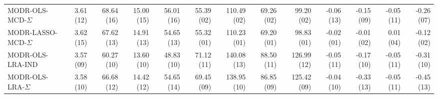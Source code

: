 \begin{tabular}{lrrrrrrrrrrrr}
MODR-OLS-MCD-$\Sigma$ & {\cellcolor[HTML]{D38E8E}} \color[HTML]{F1F1F1} 3.61 (12) & {\cellcolor[HTML]{CD5C5C}} \color[HTML]{F1F1F1} 68.64 (16) & {\cellcolor[HTML]{CD6060}} \color[HTML]{F1F1F1} 15.00 (15) & {\cellcolor[HTML]{CD5C5C}} \color[HTML]{F1F1F1} 56.01 (16) & {\cellcolor[HTML]{008080}} \color[HTML]{F1F1F1} 55.39 (02) & {\cellcolor[HTML]{028181}} \color[HTML]{F1F1F1} 110.49 (02) & {\cellcolor[HTML]{008080}} \color[HTML]{F1F1F1} 69.26 (02) & {\cellcolor[HTML]{038181}} \color[HTML]{F1F1F1} 99.20 (02) & {\cellcolor[HTML]{8ABABA}} \color[HTML]{000000} -0.06 (13) & {\cellcolor[HTML]{D7ADAD}} \color[HTML]{000000} -0.15 (09) & {\cellcolor[HTML]{D8BCBC}} \color[HTML]{000000} -0.05 (11) & {\cellcolor[HTML]{C0D0D0}} \color[HTML]{000000} -0.26 (07) \\
MODR-LASSO-MCD-$\Sigma$ & {\cellcolor[HTML]{D28888}} \color[HTML]{F1F1F1} 3.62 (15) & {\cellcolor[HTML]{CE6161}} \color[HTML]{F1F1F1} 67.62 (13) & {\cellcolor[HTML]{CE6464}} \color[HTML]{F1F1F1} 14.91 (13) & {\cellcolor[HTML]{CE6464}} \color[HTML]{F1F1F1} 54.65 (13) & {\cellcolor[HTML]{008080}} \color[HTML]{F1F1F1} 55.32 (01) & {\cellcolor[HTML]{008080}} \color[HTML]{F1F1F1} 110.23 (01) & {\cellcolor[HTML]{008080}} \color[HTML]{F1F1F1} 69.20 (01) & {\cellcolor[HTML]{008080}} \color[HTML]{F1F1F1} 98.83 (01) & {\cellcolor[HTML]{008080}} \color[HTML]{F1F1F1} -0.02 (01) & {\cellcolor[HTML]{429B9B}} \color[HTML]{F1F1F1} -0.01 (02) & {\cellcolor[HTML]{A9C7C7}} \color[HTML]{000000} 0.01 (04) & {\cellcolor[HTML]{289191}} \color[HTML]{F1F1F1} -0.12 (02) \\
MODR-OLS-LRA-IND & {\cellcolor[HTML]{D8B6B6}} \color[HTML]{000000} 3.57 (09) & {\cellcolor[HTML]{D38D8D}} \color[HTML]{F1F1F1} 60.27 (10) & {\cellcolor[HTML]{D5A3A3}} \color[HTML]{000000} 13.60 (10) & {\cellcolor[HTML]{D38C8C}} \color[HTML]{F1F1F1} 48.83 (10) & {\cellcolor[HTML]{D7B0B0}} \color[HTML]{000000} 71.12 (11) & {\cellcolor[HTML]{DACDCD}} \color[HTML]{000000} 140.08 (13) & {\cellcolor[HTML]{D7B1B1}} \color[HTML]{000000} 88.50 (11) & {\cellcolor[HTML]{DBD2D2}} \color[HTML]{000000} 126.99 (12) & {\cellcolor[HTML]{6EAEAE}} \color[HTML]{F1F1F1} -0.05 (11) & {\cellcolor[HTML]{D6A7A7}} \color[HTML]{000000} -0.17 (10) & {\cellcolor[HTML]{D8BCBC}} \color[HTML]{000000} -0.05 (11) & {\cellcolor[HTML]{DBD5D5}} \color[HTML]{000000} -0.31 (10) \\
MODR-OLS-LRA-$\Sigma$ & {\cellcolor[HTML]{D6A6A6}} \color[HTML]{000000} 3.58 (10) & {\cellcolor[HTML]{CE6767}} \color[HTML]{F1F1F1} 66.68 (12) & {\cellcolor[HTML]{D17B7B}} \color[HTML]{F1F1F1} 14.42 (12) & {\cellcolor[HTML]{CE6464}} \color[HTML]{F1F1F1} 54.65 (14) & {\cellcolor[HTML]{D9C0C0}} \color[HTML]{000000} 69.45 (09) & {\cellcolor[HTML]{DBD2D2}} \color[HTML]{000000} 138.95 (10) & {\cellcolor[HTML]{D9BEBE}} \color[HTML]{000000} 86.85 (09) & {\cellcolor[HTML]{DCD9D9}} \color[HTML]{000000} 125.42 (09) & {\cellcolor[HTML]{5FA8A8}} \color[HTML]{F1F1F1} -0.04 (10) & {\cellcolor[HTML]{D28787}} \color[HTML]{F1F1F1} -0.33 (13) & {\cellcolor[HTML]{D8BCBC}} \color[HTML]{000000} -0.05 (11) & {\cellcolor[HTML]{D6AAAA}} \color[HTML]{000000} -0.45 (13) \\

\end{tabular}

